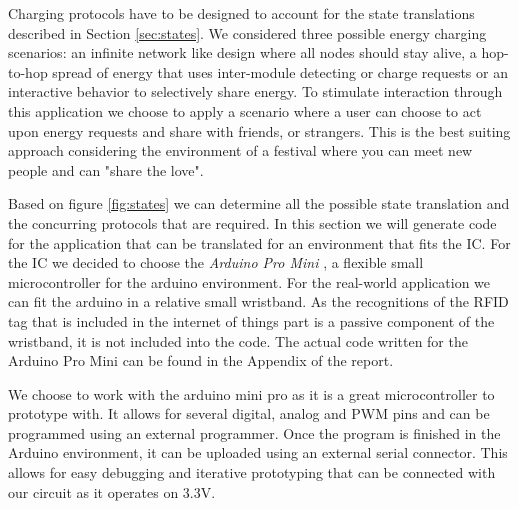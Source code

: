 %
Charging protocols have to be designed to account for the state translations described in Section \ref{sec:states}. We considered three possible energy charging scenarios: an infinite network like design where all nodes should stay alive, a hop-to-hop spread of energy that uses inter-module detecting or charge requests or an interactive behavior to selectively share energy. To stimulate interaction through this application we choose to apply a scenario where a user can choose to act upon energy requests and share with friends, or strangers. This is the best suiting approach considering the environment of a festival where you can meet new people and can "share the love". 

Based on figure \ref{fig:states} we can determine all the possible state translation and the concurring protocols that are required. In this section we will generate code for the application that can be translated for an environment that fits the IC. For the IC we decided to choose the \emph{Arduino Pro Mini} \cite{promini}, a flexible small microcontroller for the arduino environment. For the real-world application we can fit the arduino in a relative small wristband.  As the recognitions of the RFID tag that is included in the internet of things part is a passive component of the wristband, it is not included into the code. The actual code written for the Arduino Pro Mini can be found in the Appendix of the report. 

We choose to work with the arduino mini pro as it is a great microcontroller to prototype with. It allows for several digital, analog and PWM pins and can be programmed using an external programmer. Once the program is finished in the Arduino environment, it can be uploaded using an external serial connector. This allows for easy debugging and iterative prototyping that can be connected with our circuit as it operates on 3.3V.
%
%


